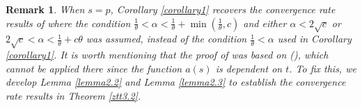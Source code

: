 \documentclass[review]{elsarticle}
\newtheorem{corollary}{Corollary}[section]
\newtheorem{remark}{Remark}[section]
\begin{document}
	
	\begin{remark}\label{remark4}
When $s=p$,  Corollary \ref{corollary1} recovers  the convergence rate results of  \cite[Theorem 3.2]{ChbaniRBOn(2024)} where the condition
 $\frac{1}{\theta}<\alpha<\frac{1}{\theta}+\min(\frac{1}{\theta}, c)$ and either $\alpha<2\sqrt{c}$ or $2\sqrt{c}<\alpha<\frac{1}{\theta}+c\theta$ was assumed, instead of the condition $\frac{1}{\theta}<\alpha$ used in  Corollary \ref{corollary1}. It is worth mentioning that the proof of  \cite[Theorem 3.2]{ChbaniRBOn(2024)} was based on  \cite[Lemma 2.1]{ChbaniRBOn(2024)} (\cite[Lemma 6]{HeHFiietal(2022)}), which cannot be  applied there since the  function $a(s)$ is dependent on $t$. To fix this, we develop Lemma  \ref{lemma2.2} and Lemma  \ref{lemma2.3} to establish the convergence rate results in  Theorem \ref{ztt3.2}.
	\end{remark}
	
\end{document}
